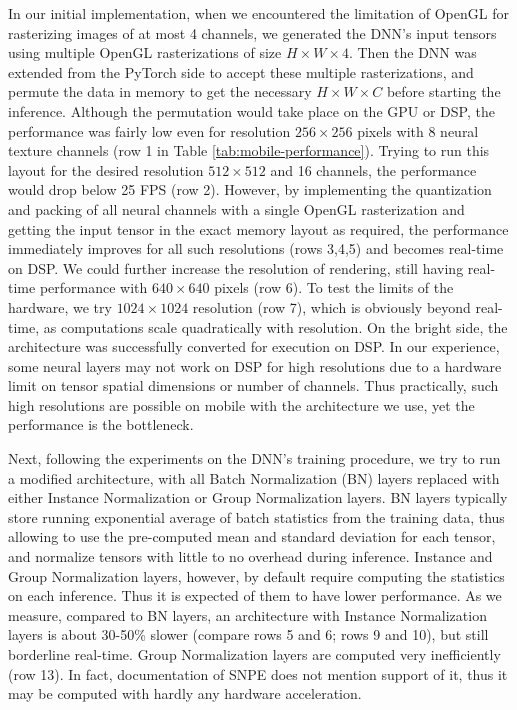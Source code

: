 In our initial implementation, when we encountered the limitation of OpenGL for rasterizing images of at most 4 channels, we generated the DNN's input tensors using multiple OpenGL rasterizations of size $H \times W \times 4$. Then the DNN was extended from the PyTorch side to accept these multiple rasterizations, and permute the data in memory to get the necessary $H \times W \times C$ before starting the inference. Although the permutation would take place on the GPU or DSP, the performance was fairly low even for resolution $256 \times 256$ pixels with 8 neural texture channels (row 1 in Table \ref{tab:mobile-performance}). Trying to run this layout for the desired resolution $512 \times 512$ and 16 channels, the performance would drop below 25 FPS (row 2). However, by implementing the quantization and packing of all neural channels with a single OpenGL rasterization and getting the input tensor in the exact memory layout as required, the performance immediately improves for all such resolutions (rows 3,4,5) and becomes real-time on DSP. We could further increase the resolution of rendering, still having real-time performance with $640 \times 640$ pixels (row 6). To test the limits of the hardware, we try $1024 \times 1024$ resolution (row 7), which is obviously beyond real-time, as computations scale quadratically with resolution. On the bright side, the architecture was successfully converted for execution on DSP. In our experience, some neural layers may not work on DSP for high resolutions due to a hardware limit on tensor spatial dimensions or number of channels. Thus practically, such high resolutions are possible on mobile with the architecture we use, yet the performance is the bottleneck. 

Next, following the experiments on the DNN's training procedure, we try to run a modified architecture, with all Batch Normalization (BN) layers replaced with either Instance Normalization or Group Normalization layers. BN layers typically store running exponential average of batch statistics from the training data, thus allowing to use the pre-computed mean and standard deviation for each tensor, and normalize tensors with little to no overhead during inference. Instance and Group Normalization layers, however, by default require computing the statistics on each inference. Thus it is expected of them to have lower performance. As we measure, compared to BN layers, an architecture with Instance Normalization layers is about 30-50\% slower (compare rows 5 and 6; rows 9 and 10), but still borderline real-time. Group Normalization layers are computed very inefficiently (row 13). In fact, documentation of SNPE does not mention support of it, thus it may be computed with hardly any hardware acceleration.

